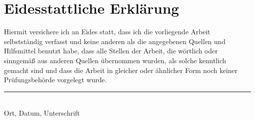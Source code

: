\chapter*{Eidesstattliche Erklärung}

Hiermit versichere ich an Eides statt, dass ich die vorliegende Arbeit selbstständig verfasst und keine anderen als die angegebenen Quellen und Hilfsmittel benutzt habe, dass alle Stellen der Arbeit, die wörtlich oder sinngemäß aus anderen Quellen übernommen wurden, als solche kenntlich gemacht sind und dass die Arbeit in gleicher oder ähnlicher Form noch keiner Prüfungsbehörde vorgelegt wurde.
\vspace{1.5cm}

\rule{12cm}{0.2mm} \\
Ort, Datum, Unterschrift